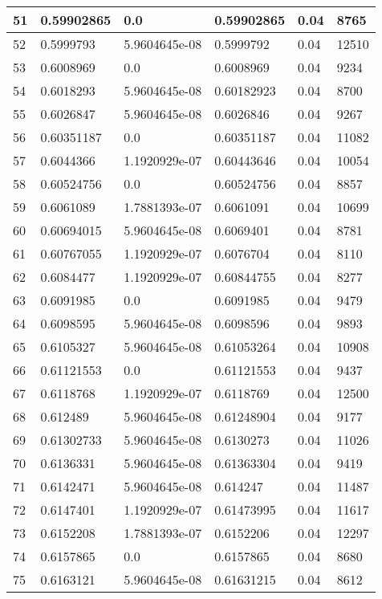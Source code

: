 \begin{longtable}{|l|l|l|l|l|l|}
51 & 0.59902865 & 0.0 & 0.59902865 & 0.04 & 8765 \\ \hline 
52 & 0.5999793 & 5.9604645e-08 & 0.5999792 & 0.04 & 12510 \\ \hline 
53 & 0.6008969 & 0.0 & 0.6008969 & 0.04 & 9234 \\ \hline 
54 & 0.6018293 & 5.9604645e-08 & 0.60182923 & 0.04 & 8700 \\ \hline 
55 & 0.6026847 & 5.9604645e-08 & 0.6026846 & 0.04 & 9267 \\ \hline 
56 & 0.60351187 & 0.0 & 0.60351187 & 0.04 & 11082 \\ \hline 
57 & 0.6044366 & 1.1920929e-07 & 0.60443646 & 0.04 & 10054 \\ \hline 
58 & 0.60524756 & 0.0 & 0.60524756 & 0.04 & 8857 \\ \hline 
59 & 0.6061089 & 1.7881393e-07 & 0.6061091 & 0.04 & 10699 \\ \hline 
60 & 0.60694015 & 5.9604645e-08 & 0.6069401 & 0.04 & 8781 \\ \hline 
61 & 0.60767055 & 1.1920929e-07 & 0.6076704 & 0.04 & 8110 \\ \hline 
62 & 0.6084477 & 1.1920929e-07 & 0.60844755 & 0.04 & 8277 \\ \hline 
63 & 0.6091985 & 0.0 & 0.6091985 & 0.04 & 9479 \\ \hline 
64 & 0.6098595 & 5.9604645e-08 & 0.6098596 & 0.04 & 9893 \\ \hline 
65 & 0.6105327 & 5.9604645e-08 & 0.61053264 & 0.04 & 10908 \\ \hline 
66 & 0.61121553 & 0.0 & 0.61121553 & 0.04 & 9437 \\ \hline 
67 & 0.6118768 & 1.1920929e-07 & 0.6118769 & 0.04 & 12500 \\ \hline 
68 & 0.612489 & 5.9604645e-08 & 0.61248904 & 0.04 & 9177 \\ \hline 
69 & 0.61302733 & 5.9604645e-08 & 0.6130273 & 0.04 & 11026 \\ \hline 
70 & 0.6136331 & 5.9604645e-08 & 0.61363304 & 0.04 & 9419 \\ \hline 
71 & 0.6142471 & 5.9604645e-08 & 0.614247 & 0.04 & 11487 \\ \hline 
72 & 0.6147401 & 1.1920929e-07 & 0.61473995 & 0.04 & 11617 \\ \hline 
73 & 0.6152208 & 1.7881393e-07 & 0.6152206 & 0.04 & 12297 \\ \hline 
74 & 0.6157865 & 0.0 & 0.6157865 & 0.04 & 8680 \\ \hline 
75 & 0.6163121 & 5.9604645e-08 & 0.61631215 & 0.04 & 8612 \\ \hline 
\end{longtable}